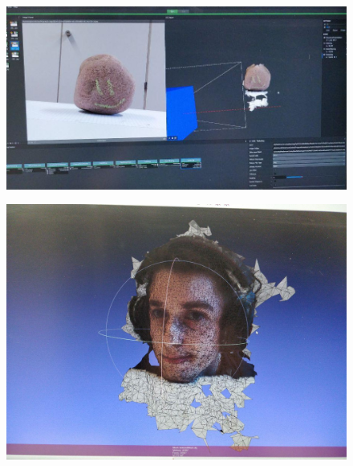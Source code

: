 	\begin{figure}[H]
	\centering
	\begin{minipage}{.5\textwidth}
		\centering
    			\includegraphics[width=.95\linewidth]{how/stone-meshed.jpg}
    			\label{stone-mesh}
	\end{minipage}%
	\begin{minipage}{.5\textwidth}
		\centering
    			\includegraphics[width=.95\linewidth]{how/headscan-devel-rig.jpg}
	    \label{face-mesh}
		\end{minipage}
	\end{figure}
	
